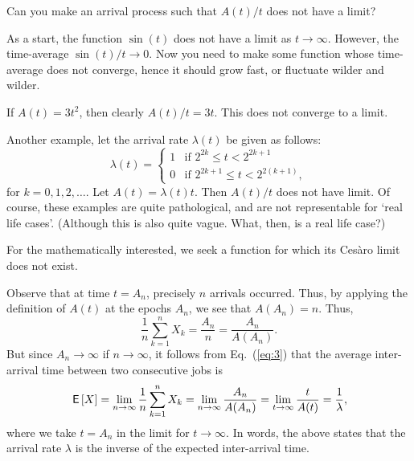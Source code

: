 \begin{exercise}[\faFlask]
  Can you make an arrival process such that $A(t)/t$ does not have a
  limit?  
  \begin{hint}
As a start, the function $\sin(t)$ does not have a limit as
    $t\to\infty$. However, the time-average $\sin(t)/t \to 0$.  Now
    you need to make some function whose time-average does not
    converge, hence it should grow fast, or fluctuate wilder and
    wilder.
  \end{hint}
  \begin{solution}
 If $A(t) = 3 t^2$, then clearly $A(t)/t = 3t$. This does not
    converge to a limit. 

  Another example, let the arrival rate $\lambda(t)$ be given as
    follows:
    \begin{equation*}
      \lambda(t) = 
    \begin{cases}
      1 & \text{if } 2^{2k} \leq t < 2^{2k+1} \\
      0 & \text{if } 2^{2k+1} \leq t < 2^{2(k+1)},
    \end{cases}
    \end{equation*}
    for $k=0,1,2,\ldots$. Let $A(t) = \lambda(t) t$. Then $A(t)/t$
    does not have limit. Of course, these examples are quite
    pathological, and are not representable for `real life cases'.
    (Although this is also quite vague. What, then, is a real life
    case?)

For the mathematically interested, we seek a
    function for which its Ces\`aro limit does not exist.
  \end{solution}
\end{exercise}



Observe that at time $t=A_n$, precisely $n$ arrivals occurred. Thus,
by applying the definition of $A(t)$ at the epochs $A_n$, we see that
$A(A_n) = n$. Thus,
\begin{equation*}
  \frac{1}n\sum_{k=1}^n X_k = \frac{A_n}n = \frac{A_n}{A(A_n)}. 
\end{equation*}
But since $A_n\to\infty$ if $n\to\infty$, it follows from
Eq.~(\ref{eq:3}) that the average inter-arrival time between two
consecutive jobs is
\begin{equation}\label{eq:54}
  \,\mathsf{E}\left[X\right] = \lim_{n\to\infty}  \frac{1}n\sum_{k=1}^n X_k = \lim_{n\to \infty} \frac{A_n}{A(A_n)} = \lim_{t\to\infty} \frac t{A(t)} = \frac 1 \lambda,
\end{equation}
where we take $t=A_n$ in the limit for $t\to\infty$.  In words, the
above states that the arrival rate $\lambda$ is the inverse of the
expected inter-arrival time.

